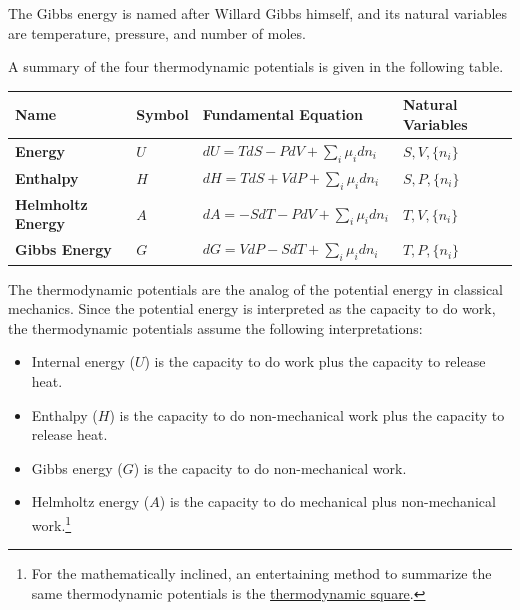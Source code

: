 \documentclass[
  9pt,
]{extbook}
\newcounter{none} %
\providecommand{\tightlist}{%
  \setlength{\itemsep}{0pt}\setlength{\parskip}{0pt}}
\theoremstyle{definition}
\theoremstyle{definition}
\theoremstyle{definition}
\theoremstyle{definition}
\theoremstyle{remark}
\begin{document}
The Gibbs energy is named after Willard Gibbs himself, and its natural variables are temperature, pressure, and number of moles.

A summary of the four thermodynamic potentials is given in the following table.

\tiny

{\def\LTcaptype{none} %
\begin{longtable}[]{@{}
  >{\centering\arraybackslash}p{}
  >{\centering\arraybackslash}p{}
  >{\centering\arraybackslash}p{}
  >{\centering\arraybackslash}p{}@{}}
\toprule\noalign{}
\begin{minipage}[b]{\linewidth}\centering
\textbf{Name}
\end{minipage} & \begin{minipage}[b]{\linewidth}\centering
\textbf{Symbol}
\end{minipage} & \begin{minipage}[b]{\linewidth}\centering
\textbf{Fundamental Equation}
\end{minipage} & \begin{minipage}[b]{\linewidth}\centering
\textbf{Natural Variables}
\end{minipage} \\
\midrule\noalign{}
\endhead
\bottomrule\noalign{}
\endlastfoot
\textbf{Energy} & \(U\) & \(dU=TdS-PdV+\sum_i\mu_i dn_i\) & \(S,V,\{n_i\}\) \\
\textbf{Enthalpy} & \(H\) & \(dH=TdS+VdP+\sum_i\mu_i dn_i\) & \(S,P,\{n_i\}\) \\
\textbf{Helmholtz Energy} & \(A\) & \(dA=-SdT-PdV+\sum_i\mu_i dn_i\) & \(T,V,\{n_i\}\) \\
\textbf{Gibbs Energy} & \(G\) & \(dG=VdP-SdT+\sum_i\mu_i dn_i\) & \(T,P,\{n_i\}\) \\
\end{longtable}
}

\normalsize

The thermodynamic potentials are the analog of the potential energy in classical mechanics. Since the potential energy is interpreted as the capacity to do work, the thermodynamic potentials assume the following interpretations:

\begin{itemize}
\tightlist
\item
  Internal energy (\(U\)) is the capacity to do work plus the capacity to release heat.
\item
  Enthalpy (\(H\)) is the capacity to do non-mechanical work plus the capacity to release heat.
\item
  Gibbs energy (\(G\)) is the capacity to do non-mechanical work.
\item
  Helmholtz energy (\(A\)) is the capacity to do mechanical plus non-mechanical work.\footnote{For the mathematically inclined, an entertaining method to summarize the same thermodynamic potentials is the \href{https://en.wikipedia.org/wiki/Thermodynamic_square}{thermodynamic square}.}
\end{itemize}
\end{document}
